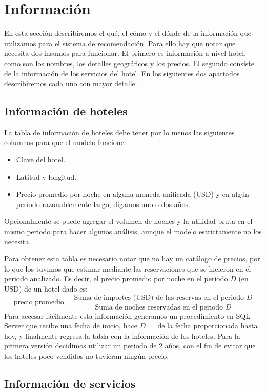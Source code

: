 \documentclass[12pt]{report}
\begin{document}
\section{Información}

En esta sección describiremos el qué, el cómo y el dónde de la información que utilizamos para el sistema de recomendación. Para ello hay que notar que necesita dos insumos para funcionar. El primero es información a nivel hotel, como son los nombres, los detalles geográficos y los precios. El segundo consiste de la información de los servicios del hotel. En los siguientes dos apartados describiremos cada uno con mayor detalle.

\subsection*{Información de hoteles}

La tabla de información de hoteles debe tener por lo menos las siguientes columnas para que el modelo funcione:
\begin{itemize}
	\item Clave del hotel.
	\item Latitud y longitud.
	\item Precio promedio por noche en alguna moneda unificada (USD) y en algún período razonablemente largo, digamos uno o dos años.
\end{itemize}
Opcionalmente se puede agregar el volumen de noches y la utilidad bruta en el mismo periodo para hacer algunos análisis, aunque el modelo estrictamente no los necesita.

Para obtener esta tabla es necesario notar que no hay un catálogo de precios, por lo que los tuvimos que estimar mediante las reservaciones que se hicieron en el periodo analizado. Es decir, el precio promedio por noche en el periodo $D$ (en USD) de un hotel dado es:
\[
\text{precio promedio} = \frac{\text{Suma de importes (USD) de las reservas en el periodo } D}{\text{Suma de noches reservadas en el periodo } D}
\]
Para accesar fácilmente esta información generamos un procedimiento en SQL Server que recibe una fecha de inicio, hace $D = $ de la fecha proporcionada hasta hoy, y finalmente regresa la tabla con la información de los hoteles. Para la primera versión decidimos utilizar un periodo de 2 años, con el fin de evitar que los hoteles poco vendidos no tuvieran ningún precio.

\subsection*{Información de servicios}
\end{document}
